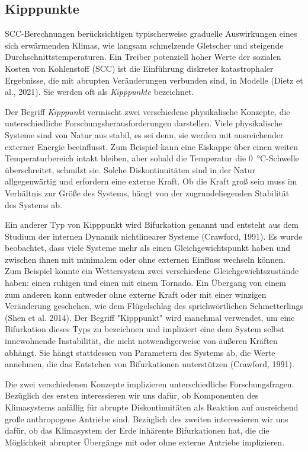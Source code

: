 \documentclass[12pt,paper=a4,DIV=12,parskip=never,chapterprefix=false,headings=standardclasses]{scrreprt}
\begin{document}
\subsection{Kipppunkte}
SCC-Berechnungen berücksichtigen typischerweise graduelle Auswirkungen eines sich erwärmenden Klimas, wie langsam schmelzende Gletscher und steigende Durchschnittstemperaturen. Ein Treiber potenziell hoher Werte der sozialen Kosten von Kohlenstoff (SCC) ist die Einführung diskreter katastrophaler Ergebnisse, die mit abrupten Veränderungen verbunden sind, in Modelle (Dietz et al., 2021). Sie werden oft als \emph{Kipppunkte} bezeichnet.

Der Begriff \emph{Kipppunkt} vermischt zwei verschiedene physikalische Konzepte, die unterschiedliche Forschungsherausforderungen darstellen. Viele physikalische Systeme sind von Natur aus stabil, es sei denn, sie werden mit ausreichender externer Energie beeinflusst. Zum Beispiel kann eine Eiskappe über einen weiten Temperaturbereich intakt bleiben, aber sobald die Temperatur die \SI{0}{\celsius}-Schwelle überschreitet, schmilzt sie. Solche Diskontinuitäten sind in der Natur allgegenwärtig und erfordern eine externe Kraft. Ob die Kraft groß sein muss im Verhältnis zur Größe des Systems, hängt von der zugrundeliegenden Stabilität des Systems ab.

Ein anderer Typ von Kipppunkt wird Bifurkation genannt und entsteht aus dem Studium der internen Dynamik nichtlinearer Systeme (Crawford, 1991). Es wurde beobachtet, dass viele Systeme mehr als einen Gleichgewichtspunkt haben und zwischen ihnen mit minimalem oder ohne externen Einfluss wechseln können. Zum Beispiel könnte ein Wettersystem zwei verschiedene Gleichgewichtszustände haben: einen ruhigen und einen mit einem Tornado. Ein Übergang von einem zum anderen kann entweder ohne externe Kraft oder mit einer winzigen Veränderung geschehen, wie dem Flügelschlag des sprichwörtlichen Schmetterlings (Shen et al. 2014). Der Begriff "Kipppunkt" wird manchmal verwendet, um eine Bifurkation dieses Typs zu bezeichnen und impliziert eine dem System selbst innewohnende Instabilität, die nicht notwendigerweise von äußeren Kräften abhängt. Sie hängt stattdessen von Parametern des Systems ab, die Werte annehmen, die das Entstehen von Bifurkationen unterstützen (Crawford, 1991).

Die zwei verschiedenen Konzepte implizieren unterschiedliche Forschungsfragen. Bezüglich des ersten interessieren wir uns dafür, ob Komponenten des Klimasystems anfällig für abrupte Diskontinuitäten als Reaktion auf ausreichend große anthropogene Antriebe sind. Bezüglich des zweiten interessieren wir uns dafür, ob das Klimasystem der Erde inhärente Bifurkationen hat, die die Möglichkeit abrupter Übergänge mit oder ohne externe Antriebe implizieren.
\end{document}
